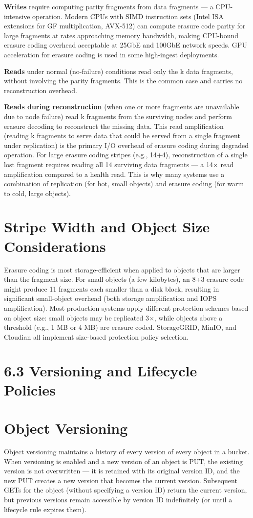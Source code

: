 \textbf{Writes} require computing parity fragments from data fragments --- a CPU-intensive operation. Modern CPUs with SIMD instruction sets (Intel ISA extensions for GF multiplication, AVX-512) can compute erasure code parity for large fragments at rates approaching memory bandwidth, making CPU-bound erasure coding overhead acceptable at 25GbE and 100GbE network speeds. GPU acceleration for erasure coding is used in some high-ingest deployments.

\textbf{Reads} under normal (no-failure) conditions read only the k data fragments, without involving the parity fragments. This is the common case and carries no reconstruction overhead.

\textbf{Reads during reconstruction} (when one or more fragments are unavailable due to node failure) read k fragments from the surviving nodes and perform erasure decoding to reconstruct the missing data. This read amplification (reading k fragments to serve data that could be served from a single fragment under replication) is the primary I/O overhead of erasure coding during degraded operation. For large erasure coding stripes (e.g., 14+4), reconstruction of a single lost fragment requires reading all 14 surviving data fragments --- a 14$\times$ read amplification compared to a health read. This is why many systems use a combination of replication (for hot, small objects) and erasure coding (for warm to cold, large objects).

\section{Stripe Width and Object Size Considerations}
Erasure coding is most storage-efficient when applied to objects that are larger than the fragment size. For small objects (a few kilobytes), an 8+3 erasure code might produce 11 fragments each smaller than a disk block, resulting in significant small-object overhead (both storage amplification and IOPS amplification). Most production systems apply different protection schemes based on object size: small objects may be replicated 3$\times$, while objects above a threshold (e.g., 1 MB or 4 MB) are erasure coded. StorageGRID, MinIO, and Cloudian all implement size-based protection policy selection.

\section{6.3 Versioning and Lifecycle Policies}
\section{Object Versioning}
Object versioning maintains a history of every version of every object in a bucket. When versioning is enabled and a new version of an object is PUT, the existing version is not overwritten --- it is retained with its original version ID, and the new PUT creates a new version that becomes the current version. Subsequent GETs for the object (without specifying a version ID) return the current version, but previous versions remain accessible by version ID indefinitely (or until a lifecycle rule expires them).

